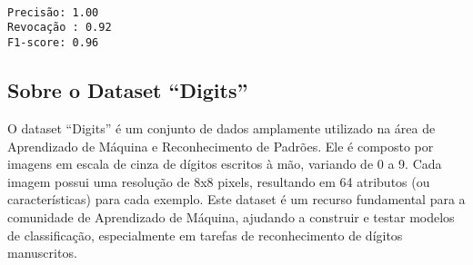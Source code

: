 \documentclass[11pt]{article}
\begin{document}
    \begin{center}
    \end{center}
    { \hspace*{\fill} \\}
    
    \begin{center}
    \end{center}
    { \hspace*{\fill} \\}
    
    \begin{center}
    \end{center}
    { \hspace*{\fill} \\}
    
    \begin{Verbatim}[commandchars=\\\{\}]
Precisão: 1.00
Revocação : 0.92
F1-score: 0.96
    \end{Verbatim}

    \hypertarget{sobre-o-dataset-digits}{%
\subsection{Sobre o Dataset ``Digits''}\label{sobre-o-dataset-digits}}

O dataset ``Digits'' é um conjunto de dados amplamente utilizado na área
de Aprendizado de Máquina e Reconhecimento de Padrões. Ele é composto
por imagens em escala de cinza de dígitos escritos à mão, variando de 0
a 9. Cada imagem possui uma resolução de 8x8 pixels, resultando em 64
atributos (ou características) para cada exemplo. Este dataset é um
recurso fundamental para a comunidade de Aprendizado de Máquina,
ajudando a construir e testar modelos de classificação, especialmente em
tarefas de reconhecimento de dígitos manuscritos.
\end{document}
